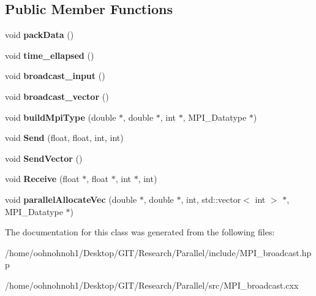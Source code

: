\subsection*{Public Member Functions}
\begin{DoxyCompactItemize}
\item 
\mbox{\label{classMPI__BC_ae489483851e7b20c09ffe112e514f25c}} 
void {\bfseries pack\+Data} ()
\item 
\mbox{\label{classMPI__BC_a833339bd5f16e9d09c1ae15f2870c175}} 
void {\bfseries time\+\_\+ellapsed} ()
\item 
\mbox{\label{classMPI__BC_a336da02d01deace3059d280a5d797d46}} 
void {\bfseries broadcast\+\_\+input} ()
\item 
\mbox{\label{classMPI__BC_a71eb5c66f0072f0c55c8975898eb8edb}} 
void {\bfseries broadcast\+\_\+vector} ()
\item 
\mbox{\label{classMPI__BC_a040c0384ca72ca971eeea94a7e90aa05}} 
void {\bfseries build\+Mpi\+Type} (double $\ast$, double $\ast$, int $\ast$, M\+P\+I\+\_\+\+Datatype $\ast$)
\item 
\mbox{\label{classMPI__BC_a2134566ddece0822a5e3714b3ec13c20}} 
void {\bfseries Send} (float, float, int, int)
\item 
\mbox{\label{classMPI__BC_ada7b741145acc727755fa5dfabbc9575}} 
void {\bfseries Send\+Vector} ()
\item 
\mbox{\label{classMPI__BC_a64ce44132cb41a0cd45ac15601bba6a2}} 
void {\bfseries Receive} (float $\ast$, float $\ast$, int $\ast$, int)
\item 
\mbox{\label{classMPI__BC_a7bfcbf6d2b35ef6894dca53ac4b14af1}} 
void {\bfseries parallel\+Allocate\+Vec} (double $\ast$, double $\ast$, int, std\+::vector$<$ int $>$ $\ast$, M\+P\+I\+\_\+\+Datatype $\ast$)
\end{DoxyCompactItemize}


The documentation for this class was generated from the following files\+:\begin{DoxyCompactItemize}
\item 
/home/oohnohnoh1/\+Desktop/\+G\+I\+T/\+Research/\+Parallel/include/M\+P\+I\+\_\+broadcast.\+hpp\item 
/home/oohnohnoh1/\+Desktop/\+G\+I\+T/\+Research/\+Parallel/src/M\+P\+I\+\_\+broadcast.\+cxx\end{DoxyCompactItemize}
